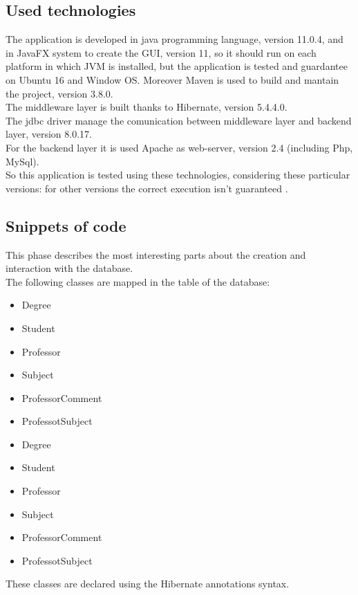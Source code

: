 \documentclass[a4paper, oneside]{article}
\begin{document}
\subsection{Used technologies}
The application is developed in java programming language, version 11.0.4, and in JavaFX system to create the GUI, version 11, so it should run on each platform in which JVM is installed, but the application is tested and guardantee on Ubuntu 16 and Window OS. Moreover Maven is used  to build and mantain the project, version 3.8.0. \\
The middleware layer is built thanks to Hibernate, version 5.4.4.0.\\
The jdbc driver manage the comunication between middleware layer and backend layer, version 8.0.17.\\ 
For the backend layer it is used Apache as web-server, version 2.4 (including Php, MySql).\\
So this application is tested using these technologies, considering these particular versions: for other versions the correct execution isn't guaranteed .
\subsection{Snippets of code}
This phase describes the most interesting parts about the creation and interaction with the database.\\
The following classes are mapped in the table of the database: 

\begin{itemize}	
\item Degree
\item Student
\item Professor
\item Subject
\item ProfessorComment
\item ProfessotSubject
\end{itemize}


\begin{itemize}	
\item Degree
\item Student
\item Professor
\item Subject
\item ProfessorComment
\item ProfessotSubject
\end{itemize}
These classes are declared using the Hibernate annotations syntax.\\
\end{document}
